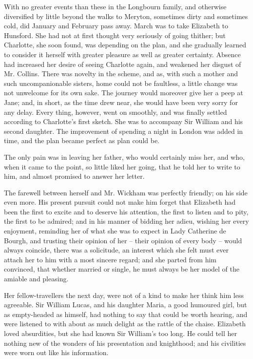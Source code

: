 
With no greater events than these in the Longbourn
family, and otherwise diversified by little beyond the walks
to Meryton, sometimes dirty and sometimes cold, did
January and February pass away. March was to take
Elizabeth to Hunsford. She had not at first thought very
seriously of going thither; but Charlotte, she soon found,
was depending on the plan, and she gradually learned to
consider it herself with greater pleasure as well as greater
certainty. Absence had increased her desire of seeing
Charlotte again, and weakened her disgust of Mr. Collins.
There was novelty in the scheme, and as, with such a
mother and such uncompanionable sisters, home could
not be faultless, a little change was not unwelcome for
its own sake. The journey would moreover give her a peep
at Jane; and, in short, as the time drew near, she would
have been very sorry for any delay. Every thing, however,
went on smoothly, and was finally settled according to
Charlotte’s first sketch. She was to accompany Sir William
and his second daughter. The improvement of spending
a night in London was added in time, and the plan became
perfect as plan could be.

The only pain was in leaving her father, who would
certainly miss her, and who, when it came to the point,
so little liked her going, that he told her to write to him,
and almost promised to answer her letter.

The farewell between herself and Mr. Wickham was
perfectly friendly; on his side even more. His present
pursuit could not make him forget that Elizabeth had
been the first to excite and to deserve his attention, the
first to listen and to pity, the first to be admired; and
in his manner of bidding her adieu, wishing her every
enjoyment, reminding her of what she was to expect in
Lady Catherine de Bourgh, and trusting their opinion of
her -- their opinion of every body -- would always coincide,
there was a solicitude, an interest which she felt must
ever attach her to him with a most sincere regard; and
she parted from him convinced, that whether married or
single, he must always be her model of the amiable and
pleasing.

Her fellow-travellers the next day, were not of a kind
to make her think him less agreeable. Sir William Lucas,
and his daughter Maria, a good humoured girl, but as
empty-headed as himself, had nothing to say that could
be worth hearing, and were listened to with about as much
delight as the rattle of the chaise. Elizabeth loved
absurdities, but she had known Sir William’s too long.
He could tell her nothing new of the wonders of his
presentation and knighthood; and his civilities were worn
out like his information.

